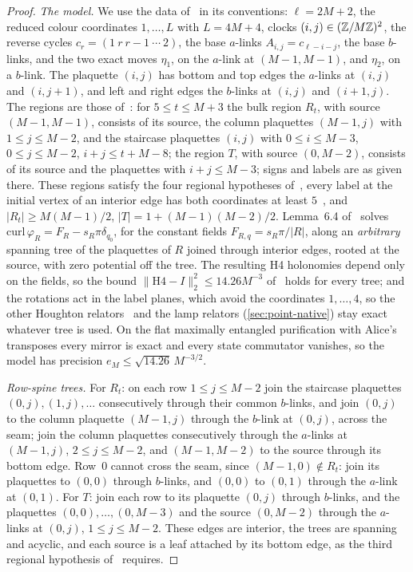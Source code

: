 \begin{proof}
\emph{The model.} We use the data of~\cite[Section~6]{DM-H3} in its conventions: $\ell=2M+2$, the reduced colour coordinates
$1,\dots,L$ with $L=4M+4$, clocks $(i,j)\in(\mathbb Z/M\mathbb Z)^2$, the reverse cycles $c_r=(1\ r\ r{-}1\ \cdots\ 2)$, the base $a$-links
$A_{i,j}=c_{\ell-i-j}$, the base $b$-links, and the two exact moves $\eta_1$, on the $a$-link at $(M-1,M-1)$, and $\eta_2$, on a $b$-link.
The plaquette $(i,j)$ has bottom and top edges the $a$-links at $(i,j)$ and $(i,j+1)$, and left and right edges the $b$-links at
$(i,j)$ and $(i+1,j)$. The regions are those of~\cite[proof of Proposition~6.5]{DM-H3}: for $5\le t\le M+3$ the bulk region $R_t$, with
source $(M-1,M-1)$, consists of its source, the column plaquettes $(M-1,j)$ with $1\le j\le M-2$, and the staircase plaquettes $(i,j)$
with $0\le i\le M-3$, $0\le j\le M-2$, $i+j\le t+M-8$; the region $T$, with source $(0,M-2)$, consists of its source and the plaquettes
with $i+j\le M-3$; signs and labels are as given there. These regions satisfy the four regional hypotheses of~\cite[Lemma~6.4]{DM-H3}, every label at the
initial vertex of an interior edge has both coordinates at least $5$~\cite[proof of Proposition~6.5]{DM-H3}, and
$|R_t|\ge M(M-1)/2$, $|T|=1+(M-1)(M-2)/2$. Lemma~6.4 of~\cite{DM-H3} solves $\mathrm{curl}\,\varphi_R=F_R-s_R\pi\delta_{q_0}$, for the
constant fields $F_{R,q}=s_R\pi/|R|$, along an \emph{arbitrary} spanning tree of the plaquettes of $R$ joined through interior edges,
rooted at the source, with zero potential off the tree. The resulting H4 holonomies depend only on the fields, so the bound
$\|\mathrm{H4}-I\|_2^2\le14.26M^{-3}$ of~\cite[Proposition~6.5]{DM-H3} holds for every tree; and the rotations act in the label planes,
which avoid the coordinates $1,\dots,4$, so the other Houghton relators~\cite[Lemma~6.4]{DM-H3} and the lamp relators
(\cref{sec:point-native}) stay exact whatever tree is used. On the flat maximally entangled purification with Alice's transposes
every mirror is exact and every state commutator vanishes, so the model has precision $e_M\le\sqrt{14.26}\,M^{-3/2}$.

\emph{Row-spine trees.} For $R_t$: on each row $1\le j\le M-2$ join the staircase plaquettes $(0,j),(1,j),\dots$ consecutively
through their common $b$-links, and join $(0,j)$ to the column plaquette $(M-1,j)$ through the $b$-link at $(0,j)$, across the seam;
join the column plaquettes consecutively through the $a$-links at $(M-1,j)$, $2\le j\le M-2$, and $(M-1,M-2)$ to the source through
its bottom edge. Row~$0$ cannot cross the seam, since $(M-1,0)\notin R_t$: join its plaquettes to $(0,0)$ through $b$-links, and $(0,0)$
to $(0,1)$ through the $a$-link at $(0,1)$. For $T$: join each row to its plaquette $(0,j)$ through $b$-links, and the plaquettes
$(0,0),\dots,(0,M-3)$ and the source $(0,M-2)$ through the $a$-links at $(0,j)$, $1\le j\le M-2$. These edges are interior, the trees
are spanning and acyclic, and each source is a leaf attached by its bottom edge, as the third regional hypothesis of~\cite[Lemma~6.4]{DM-H3} requires.


\end{proof}
